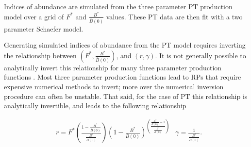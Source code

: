 \documentclass[12pt]{article}
\begin{document}
%
Indices of abundance are simulated from the three parameter PT production model 
over a grid of $F^*$ and $\frac{B^*}{\bar B(0)}$ values. These PT data are then 
fit with a two parameter Schaefer model. 


Generating simulated indices of abundance from the PT model requires 
inverting the relationship between $\left(F^*, \frac{B^*}{\bar B(0)}\right)$, and 
$(r, \gamma)$. It is not generally possible to analytically invert this 
relationship for many three parameter production functions . %
Most three parameter production functions lead to RPs that require expensive 
numerical methods to invert; more over the numerical inversion procedure can %
often be unstable. That said, for the case of PT this relationship is 
analytically invertible, and leads to the following relationship

%
\begin{align}
&r = F^*\left( \frac{1-\frac{B^*}{\bar B(0)}}{\frac{B^*}{\bar B(0)}} \right) \left(1-\frac{B^*}{\bar B(0)}\right)^{\left( \frac{\frac{B^*}{\bar B(0)}-1}{\frac{B^*}{\bar B(0)}} \right)}
&\gamma = \frac{1}{\frac{B^*}{\bar B(0)}}. \label{rg}
\end{align}

%
\end{document}
